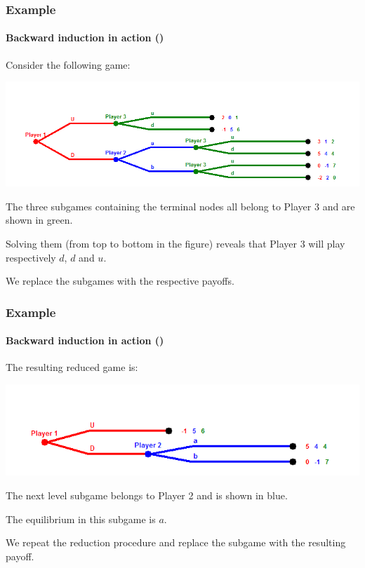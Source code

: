 \documentclass[10pt]{beamer}
\theoremstyle{definition}
\begin{document}
\setcounter{slidenum}{1}
\begin{frame}[fragile]
\frametitle{Example }
\framesubtitle{Backward induction in action ()}
Consider the following game:
\begin{center}
\includegraphics[width=0.9\linewidth]{Backward_induction_1}
\end{center}\bigskip

\begin{itemize}{\small
\item The three subgames containing the terminal nodes all belong to Player 3 and are shown in green.
\item Solving them (from top to bottom in the figure) reveals that Player 3 will play respectively $ d $, $ d $ and $ u $.
\item We replace the subgames with the respective payoffs.}
\end{itemize}
\end{frame}


\begin{frame}[fragile]
\frametitle{Example }
\framesubtitle{Backward induction in action ()}
The resulting reduced game is:
\begin{center}
\includegraphics[width=0.9\linewidth]{Backward_induction_2}
\end{center}\bigskip

\begin{itemize}{\small
\item The next level subgame belongs to Player 2 and is shown in blue.
\item The equilibrium in this subgame is $ a $.
\item We repeat the reduction procedure and replace the subgame with the resulting payoff.}
\end{itemize}
\end{frame}
\end{document}
